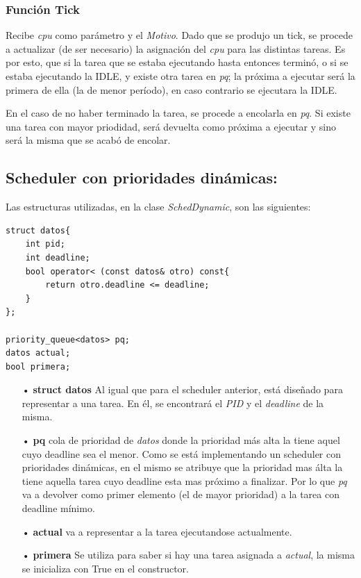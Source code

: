 \documentclass[a4paper]{article}
\begin{document}
\subsubsection*{Funci\'on Tick}	

Recibe \emph{cpu} como par\'ametro y el \emph{Motivo}. Dado que se produjo un tick, se procede a actualizar (de ser necesario) la asignación del \emph{cpu} para las distintas tareas.  Es por esto, que si la tarea que se estaba ejecutando hasta entonces terminó, o si se estaba ejecutando la IDLE, y existe otra tarea en \emph{pq}; la próxima a ejecutar será la primera de ella (la de menor período), en caso contrario se ejecutara la IDLE. 

En el caso de no haber terminado la tarea, se procede a encolarla en \emph{pq}. Si existe una tarea con mayor priodidad, ser\'a devuelta como próxima a ejecutar y sino ser\'a la misma que se acab\'o de encolar. \\ 


 
\bigskip 

\subsection*{Scheduler con prioridades dinámicas:}

Las estructuras utilizadas, en la clase \emph{SchedDynamic}, son las siguientes:
	\begin{codesnippet}
	\begin{verbatim}
struct datos{
    int pid;
    int deadline;
    bool operator< (const datos& otro) const{
        return otro.deadline <= deadline; 
    }
};

priority_queue<datos> pq;
datos actual;
bool primera;
	\end{verbatim}
	\end{codesnippet}
	
	\begin{itemize}
	
	\item[•]\textbf{struct datos} Al igual que para el scheduler anterior, est\'a diseñado para representar a una tarea. En él, se encontrar\'a el \emph{PID} y el \emph{deadline} de la misma.
	\item[•]\textbf{pq} cola de prioridad de \emph{datos} donde la prioridad más alta la tiene aquel cuyo deadline sea el menor. Como se est\'a implementando un scheduler con prioridades dinámicas, en el mismo se atribuye que la prioridad mas álta la tiene aquella tarea cuyo deadline esta mas próximo a finalizar. Por lo que \emph{pq} va a devolver como primer elemento (el de mayor prioridad) a la tarea con deadline m\'inimo.
	\item[•]\textbf{actual} va a representar a la tarea ejecutandose actualmente.
	\item[•]\textbf{primera} Se utiliza para saber si hay una tarea asignada a \emph{actual}, la misma se inicializa con True en el constructor.
	\end{itemize}	
\end{document}
